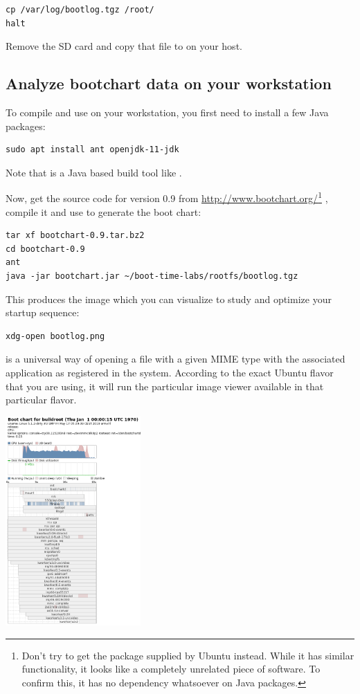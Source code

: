 \begin{verbatim}
cp /var/log/bootlog.tgz /root/
halt
\end{verbatim}

Remove the SD card and copy that file to  on your host.

\subsection{Analyze bootchart data on your workstation}

To compile and use  on your workstation, you first need to
install a few Java packages:

\begin{verbatim}
sudo apt install ant openjdk-11-jdk
\end{verbatim}

Note that  is a Java based build tool like .

Now, get the  source code for version 0.9 from
\url{http://www.bootchart.org/}\footnote{Don't try to get the  package supplied by
Ubuntu instead. While it has similar functionality, it looks like a completely
unrelated piece of software. To confirm this, it has no dependency
whatsoever on Java packages.}
, compile it and use  to generate the boot
chart:

\begin{verbatim}
tar xf bootchart-0.9.tar.bz2
cd bootchart-0.9
ant
java -jar bootchart.jar ~/boot-time-labs/rootfs/bootlog.tgz 
\end{verbatim}

This produces the  image which you can visualize to
study and optimize your startup sequence:

\begin{verbatim}
xdg-open bootlog.png
\end{verbatim}

 is a universal way of opening a file with a given MIME
type with the associated application as registered in the system.
According to the exact Ubuntu flavor that you are using,
it will run the particular image viewer available in that
particular flavor.

\begin{center}
\includegraphics[height=8cm]{labs/boot-time-init-scripts/bootlog.png}
\end{center}

